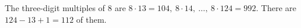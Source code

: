 The three-digit multiples of $8$ are $8\cdot13=104,\ 8\cdot14,\ \dots,\ 8\cdot124=992$. There are $124-13+1=\boxed{112}$ of them.
